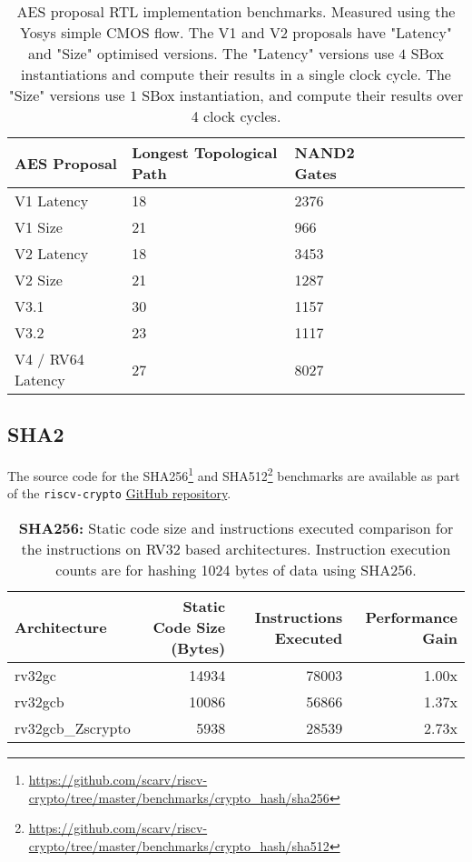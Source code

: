 \begin{table}[h]
\centering
\begin{tabular}{llllllll}
AES Proposal & Longest Topological Path & NAND2 Gates \\ \hline
V1 Latency   & 18                       & 2376        \\
V1 Size      & 21                       & 966         \\
V2 Latency   & 18                       & 3453        \\
V2 Size      & 21                       & 1287        \\
V3.1         & 30                       & 1157        \\
V3.2         & 23                       & 1117        \\
V4 / RV64 Latency & 27                  & 8027        \\
\end{tabular}
\caption{
AES proposal RTL implementation benchmarks.
Measured using the Yosys simple CMOS flow.
The V1 and V2 proposals have "Latency" and "Size" optimised versions.
The "Latency" versions use $4$ SBox instantiations and compute their
results in a single clock cycle.
The "Size" versions use $1$ SBox instantiation, and compute their
results over 4 clock cycles.
}
\label{tab:benchmarks:aes:impl}
\end{table}

\newpage
\subsection{SHA2}
\label{sec:benchmark:sha2}

The source code for the
SHA256\footnote{\url{https://github.com/scarv/riscv-crypto/tree/master/benchmarks/crypto_hash/sha256}}
and
SHA512\footnote{\url{https://github.com/scarv/riscv-crypto/tree/master/benchmarks/crypto_hash/sha512}}
benchmarks are available as part of the {\tt riscv-crypto}
\href{https://github.com/scarv/riscv-crypto/tree/master/benchmarks/crypto_block/aes}{GitHub repository}.

\begin{table}[h]
\centering
\begin{tabular}{lrrr}
Architecture      & Static Code Size (Bytes) & Instructions Executed & Performance Gain \\ \hline
rv32gc            & 14934                    & 78003 & 1.00x          \\
rv32gcb           & 10086                    & 56866 & 1.37x          \\
rv32gcb\_Zscrypto & 5938                     & 28539 & 2.73x 
\end{tabular}
\caption{{\bf SHA256:}
Static code size and instructions executed comparison for
the  instructions on RV32 based architectures.
Instruction execution counts are for hashing 1024 bytes of data using
SHA256.
}
\label{tab:benchmarks:sha256}
\end{table}

